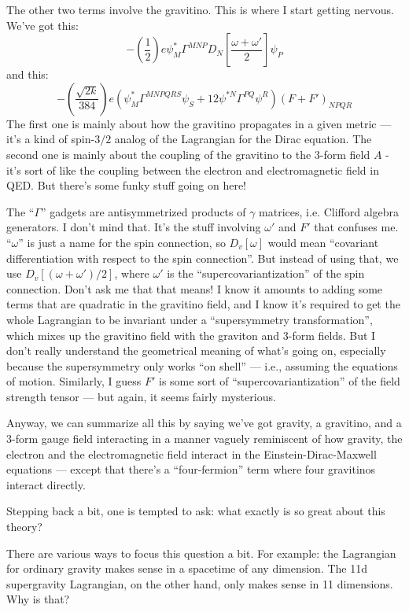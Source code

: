 \documentclass{article}
\begin{document}
The other two terms involve the gravitino. This is where I start getting
nervous. We've got this:
\[-\left(\frac{1}{2}\right) e\psi_M^* \Gamma^{MNP} D_N\left[\frac{\omega+\omega'}{2}\right]\psi_P\]
and this:
\[- \left(\frac{\sqrt{2k}}{384}\right) e(\psi_M^* \Gamma^{MNPQRS}\psi_S + 12\psi^{*N}\Gamma^{PQ}\psi^R)(F+F')_{NPQR}\]
The first one is mainly about how the gravitino propagates in a given
metric --- it's a kind of spin-\(3/2\) analog of the Lagrangian for the
Dirac equation. The second one is mainly about the coupling of the
gravitino to the \(3\)-form field \(A\) - it's sort of like the coupling
between the electron and electromagnetic field in QED. But there's some
funky stuff going on here!

The ``\(\Gamma\)'' gadgets are antisymmetrized products of \(\gamma\)
matrices, i.e. Clifford algebra generators. I don't mind that. It's the
stuff involving \(\omega'\) and \(F'\) that confuses me. ``\(\omega\)''
is just a name for the spin connection, so \(D_v[\omega]\) would mean
``covariant differentiation with respect to the spin connection''. But
instead of using that, we use \(D_v[(\omega + \omega')/2]\), where
\(\omega'\) is the ``supercovariantization'' of the spin connection.
Don't ask me that that means! I know it amounts to adding some terms
that are quadratic in the gravitino field, and I know it's required to
get the whole Lagrangian to be invariant under a ``supersymmetry
transformation'', which mixes up the gravitino field with the graviton
and \(3\)-form fields. But I don't really understand the geometrical
meaning of what's going on, especially because the supersymmetry only
works ``on shell'' --- i.e., assuming the equations of motion.
Similarly, I guess \(F'\) is some sort of ``supercovariantization'' of
the field strength tensor --- but again, it seems fairly mysterious.

Anyway, we can summarize all this by saying we've got gravity, a
gravitino, and a \(3\)-form gauge field interacting in a manner vaguely
reminiscent of how gravity, the electron and the electromagnetic field
interact in the Einstein-Dirac-Maxwell equations --- except that there's
a ``four-fermion'' term where four gravitinos interact directly.

Stepping back a bit, one is tempted to ask: what exactly is so great
about this theory?

There are various ways to focus this question a bit. For example: the
Lagrangian for ordinary gravity makes sense in a spacetime of any
dimension. The 11d supergravity Lagrangian, on the other hand, only
makes sense in 11 dimensions. Why is that?
\end{document}
